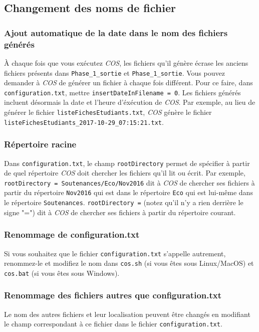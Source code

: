 \documentclass[11pt]{article}
\begin{document}
\subsection{Changement des noms de fichier}
\label{sec-7-1}
\subsubsection{Ajout automatique de la date dans le nom des fichiers générés}
\label{sec-7-1-1}
À chaque fois que vous exécutez \emph{COS}, les fichiers qu'il génère
écrase les anciens fichiers présents dans \verb~Phase_1_sortie~ et
\verb~Phase_1_sortie~. Vous pouvez demander à \emph{COS} de générer un fichier à
chaque fois différent. Pour ce faire, dans \verb~configuration.txt~, mettre
\verb~insertDateInFilename = 0~. Les fichiers générés incluent désormais la
date et l'heure d'éxécution de \emph{COS}. Par exemple, au lieu de générer
le fichier \verb~listeFichesEtudiants.txt~, \emph{COS} génère le fichier
\verb~listeFichesEtudiants_2017-10-29_07:15:21.txt~.
\subsubsection{Répertoire racine}
\label{sec-7-1-2}
Dans \verb~configuration.txt~, le champ \verb~rootDirectory~ permet de spécifier
à partir de quel répertoire \emph{COS} doit chercher les fichiers qu'il lit
ou écrit. Par exemple, \verb~rootDirectory = Soutenances/Eco/Nov2016~ dit à
\emph{COS} de chercher ses fichiers à partir du répertoire \verb~Nov2016~ qui
est dans le répertoire \verb~Eco~ qui est lui-même dans le répertoire
\verb~Soutenances~. \verb~rootDirectory =~ (notez qu'il n'y a rien derrière le
signe "=") dit à \emph{COS} de chercher ses fichiers à partir du répertoire
courant.
\subsubsection{Renommage de configuration.txt}
\label{sec-7-1-3}
Si vous souhaitez que le fichier \verb~configuration.txt~ s'appelle
autrement, renommez-le et modifiez le nom dans \verb~cos.sh~ (si vous êtes
sous Linux/MacOS) et \verb~cos.bat~ (si vous êtes sous Windows).
\subsubsection{Renommage des fichiers autres que configuration.txt}
\label{sec-7-1-4}
Le nom des autres fichiers et leur localisation peuvent être changés
en modifiant le champ correspondant à ce fichier dans le fichier
\verb~configuration.txt~.
\end{document}
